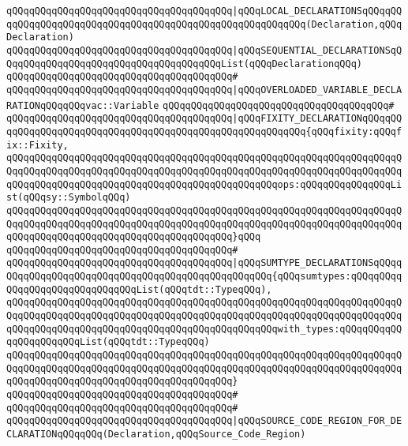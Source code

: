\verb|qQQqqQQqqQQqqQQqqQQqqQQqqQQqqQQqqQQqqQQq|\verb#|qQQqLOCAL_DECLARATIONSqQQqqQQqqQQqqQQqqQQqqQQqqQQqqQQqqQQqqQQqqQQqqQQqqQQqqQQqqQQq(Declaration,qQQqDeclaration)#\newline
\verb|qQQqqQQqqQQqqQQqqQQqqQQqqQQqqQQqqQQqqQQq|\verb#|qQQqSEQUENTIAL_DECLARATIONSqQQqqQQqqQQqqQQqqQQqqQQqqQQqqQQqqQQqqQQqList(qQQqDeclarationqQQq)#\newline
\verb|qQQqqQQqqQQqqQQqqQQqqQQqqQQqqQQqqQQqqQQq#|\newline
\verb|qQQqqQQqqQQqqQQqqQQqqQQqqQQqqQQqqQQqqQQq|\verb#|qQQqOVERLOADED_VARIABLE_DECLARATIONqQQqqQQqvac::Variable#\newline
\verb|qQQqqQQqqQQqqQQqqQQqqQQqqQQqqQQqqQQqqQQq#|\newline
\verb|qQQqqQQqqQQqqQQqqQQqqQQqqQQqqQQqqQQqqQQq|\verb#|qQQqFIXITY_DECLARATIONqQQqqQQqqQQqqQQqqQQqqQQqqQQqqQQqqQQqqQQqqQQqqQQqqQQqqQQqqQQq{qQQqfixity:qQQqfix::Fixity,#\newline
\verb|qQQqqQQqqQQqqQQqqQQqqQQqqQQqqQQqqQQqqQQqqQQqqQQqqQQqqQQqqQQqqQQqqQQqqQQqqQQqqQQqqQQqqQQqqQQqqQQqqQQqqQQqqQQqqQQqqQQqqQQqqQQqqQQqqQQqqQQqqQQqqQQqqQQqqQQqqQQqqQQqqQQqqQQqqQQqqQQqqQQqqQQqqQQqops:qQQqqQQqqQQqqQQqList(qQQqsy::SymbolqQQq)|\newline
\verb|qQQqqQQqqQQqqQQqqQQqqQQqqQQqqQQqqQQqqQQqqQQqqQQqqQQqqQQqqQQqqQQqqQQqqQQqqQQqqQQqqQQqqQQqqQQqqQQqqQQqqQQqqQQqqQQqqQQqqQQqqQQqqQQqqQQqqQQqqQQqqQQqqQQqqQQqqQQqqQQqqQQqqQQqqQQqqQQqqQQq}qQQq|\newline
\verb|qQQqqQQqqQQqqQQqqQQqqQQqqQQqqQQqqQQqqQQq#|\newline
\verb|qQQqqQQqqQQqqQQqqQQqqQQqqQQqqQQqqQQqqQQq|\verb#|qQQqSUMTYPE_DECLARATIONSqQQqqQQqqQQqqQQqqQQqqQQqqQQqqQQqqQQqqQQqqQQqqQQqqQQq{qQQqsumtypes:qQQqqQQqqQQqqQQqqQQqqQQqqQQqqQQqList(qQQqtdt::TypeqQQq),#\newline
\verb|qQQqqQQqqQQqqQQqqQQqqQQqqQQqqQQqqQQqqQQqqQQqqQQqqQQqqQQqqQQqqQQqqQQqqQQqqQQqqQQqqQQqqQQqqQQqqQQqqQQqqQQqqQQqqQQqqQQqqQQqqQQqqQQqqQQqqQQqqQQqqQQqqQQqqQQqqQQqqQQqqQQqqQQqqQQqqQQqqQQqqQQqqQQqwith_types:qQQqqQQqqQQqqQQqqQQqqQQqList(qQQqtdt::TypeqQQq)|\newline
\verb|qQQqqQQqqQQqqQQqqQQqqQQqqQQqqQQqqQQqqQQqqQQqqQQqqQQqqQQqqQQqqQQqqQQqqQQqqQQqqQQqqQQqqQQqqQQqqQQqqQQqqQQqqQQqqQQqqQQqqQQqqQQqqQQqqQQqqQQqqQQqqQQqqQQqqQQqqQQqqQQqqQQqqQQqqQQqqQQqqQQq}|\newline
\verb|qQQqqQQqqQQqqQQqqQQqqQQqqQQqqQQqqQQqqQQq#|\newline
\verb|qQQqqQQqqQQqqQQqqQQqqQQqqQQqqQQqqQQqqQQq#|\newline
\verb|qQQqqQQqqQQqqQQqqQQqqQQqqQQqqQQqqQQqqQQq|\verb#|qQQqSOURCE_CODE_REGION_FOR_DECLARATIONqQQqqQQq(Declaration,qQQqSource_Code_Region)#\newline
